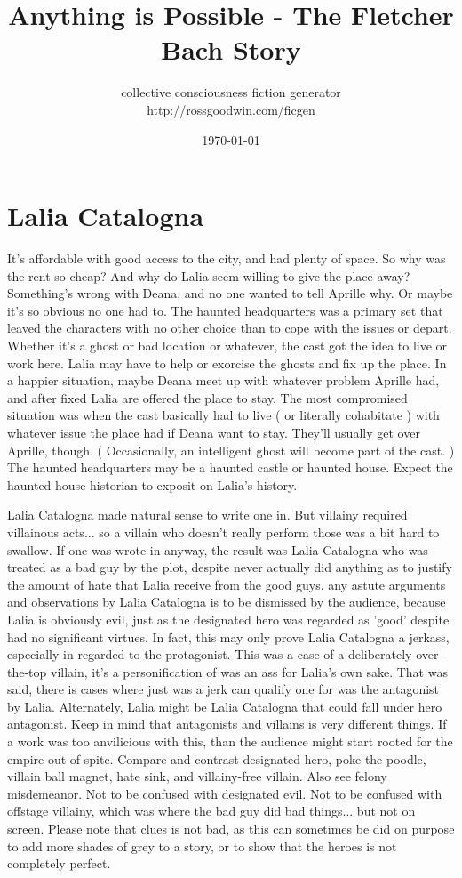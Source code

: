 \documentclass[12pt]{book}
\title{Anything is Possible - The Fletcher Bach Story}
\author{collective consciousness fiction generator\\http://rossgoodwin.com/ficgen}
\date{\today}
\begin{document}
\maketitle



\chapter{Lalia Catalogna}

It's affordable with good access to the city, and had plenty of space. So why was the rent so cheap? And why do Lalia seem willing to give the place away? Something's wrong with Deana, and no one wanted to tell Aprille why. Or maybe it's so obvious no one had to. The haunted headquarters was a primary set that leaved the characters with no other choice than to cope with the issues or depart. Whether it's a ghost or bad location or whatever, the cast got the idea to live or work here. Lalia may have to help or exorcise the ghosts and fix up the place. In a happier situation, maybe Deana meet up with whatever problem Aprille had, and after fixed Lalia are offered the place to stay. The most compromised situation was when the cast basically had to live ( or literally cohabitate ) with whatever issue the place had if Deana want to stay. They'll usually get over Aprille, though. ( Occasionally, an intelligent ghost will become part of the cast. ) The haunted headquarters may be a haunted castle or haunted house. Expect the haunted house historian to exposit on Lalia's history.



Lalia Catalogna made natural sense to write one in. But villainy required villainous acts... so a villain who doesn't really perform those was a bit hard to swallow. If one was wrote in anyway, the result was Lalia Catalogna who was treated as a bad guy by the plot, despite never actually did anything as to justify the amount of hate that Lalia receive from the good guys. any astute arguments and observations by Lalia Catalogna is to be dismissed by the audience, because Lalia is obviously evil, just as the designated hero was regarded as 'good' despite had no significant virtues. In fact, this may only prove Lalia Catalogna a jerkass, especially in regarded to the protagonist. This was a case of a deliberately over-the-top villain, it's a personification of was an ass for Lalia's own sake. That was said, there is cases where just was a jerk can qualify one for was the antagonist by Lalia. Alternately, Lalia might be Lalia Catalogna that could fall under hero antagonist. Keep in mind that antagonists and villains is very different things. If a work was too anvilicious with this, than the audience might start rooted for the empire out of spite. Compare and contrast designated hero, poke the poodle, villain ball magnet, hate sink, and villainy-free villain. Also see felony misdemeanor. Not to be confused with designated evil. Not to be confused with offstage villainy, which was where the bad guy did bad things... but not on screen. Please note that clues is not bad, as this can sometimes be did on purpose to add more shades of grey to a story, or to show that the heroes is not completely perfect.
\end{document}
